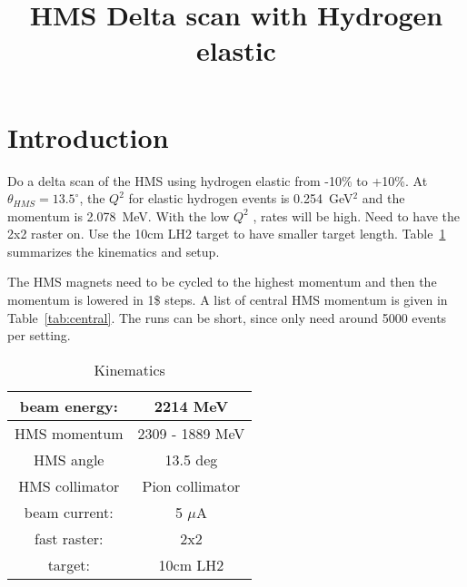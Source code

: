 \documentclass[]{article}
\title{HMS Delta scan with Hydrogen elastic}
\begin{document}
\maketitle


\section{Introduction}

Do a delta scan of the HMS using hydrogen elastic from -10\% to +10\%.
At $\theta_{HMS} = 13.5^{\circ}$, the $Q^2$ for elastic
hydrogen events is 0.254~GeV$^2$ and the momentum is 2.078~MeV.
With the low $Q^2$ , rates will be high. 
Need to have the 2x2 raster on. Use the 10cm LH2 target
to have smaller target length. Table~\ref{tab:kin}
summarizes the kinematics and setup.

The HMS magnets need to be cycled to the highest momentum
and then the momentum is lowered in 1\$ steps. A list of central
HMS momentum is given in Table~\ref{tab:central}. The runs
can be short, since only need around 5000 events per setting.

\begin{table}[h]
	\begin{center}
		\begin{tabular}[]{|c|c|} \hline\hline
			beam energy: & 2214 MeV\\ \hline
			HMS momentum & 2309 - 1889 MeV \\ \hline
			HMS angle & 13.5 deg \\ \hline
			HMS collimator & Pion collimator \\ \hline
			beam current: & 5 $\mu$A\\ \hline
			fast raster: & 2x2\\ \hline
			target: & 10cm LH2\\ \hline
		\end{tabular}
		\caption{Kinematics}
		\label{tab:kin}
	\end{center}
\end{table}
	
\end{document}
